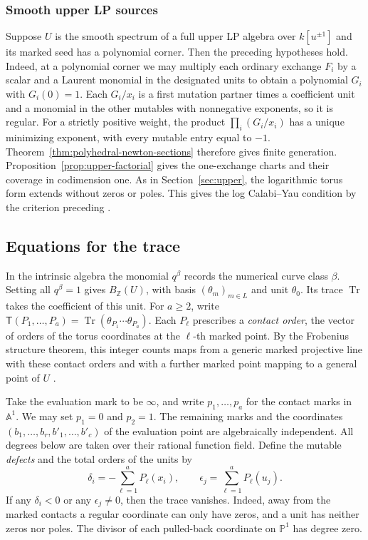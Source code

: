 \documentclass[11pt,reqno]{amsart}
\numberwithin{equation}{section}
\theoremstyle{definition}
\theoremstyle{remark}
\DeclareMathOperator{\Tr}{Tr}
\begin{document}
\subsubsection*{Smooth upper LP sources}
Suppose \(U\) is the smooth spectrum of a full upper LP algebra over
\(k[u^{\pm1}]\) and its marked seed has a polynomial corner. Then the
preceding hypotheses hold. Indeed, at a polynomial corner we may
multiply each ordinary exchange \(F_i\) by a scalar and a Laurent
monomial in the designated units to obtain a polynomial \(G_i\)
with \(G_i(0)=1\). Each \(G_i/x_i\) is a first
mutation partner times a coefficient unit and a monomial in the
other mutables with nonnegative exponents, so it is regular. For
a strictly positive weight, the product \(\prod_i(G_i/x_i)\) has
a unique minimizing exponent, with every mutable entry equal to \(-1\).
Theorem~\ref{thm:polyhedral-newton-sections} therefore gives finite
generation. Proposition~\ref{prop:upper-factorial} gives the
one-exchange charts and their coverage in codimension one. As in
Section~\ref{sec:upper}, the logarithmic torus form extends without
zeros or poles. This gives the log Calabi--Yau condition by the
criterion preceding \cite[Definition~2.1]{KY}.

\subsection{Equations for the trace}

In the intrinsic algebra the monomial \(q^\beta\) records the numerical
curve class \(\beta\). Setting all \(q^\beta=1\) gives \(B_{\mathbb Z}(U)\),
with basis \((\theta_m)_{m\in L}\) and unit \(\theta_0\). Its trace
\(\Tr\) takes the coefficient of this unit.
For \(a\ge2\), write \(\mathsf T(P_1,\ldots,P_a)=\Tr(\theta_{P_1}\cdots\theta_{P_a})\).
Each \(P_\ell\) prescribes a \emph{contact order}, the vector of
orders of the torus coordinates at the \(\ell\)-th marked point.
By the Frobenius structure theorem, this integer counts maps from a
generic marked projective line with these contact orders and with
a further marked point mapping to a general point of \(U\)
\cite[Theorem~1.2 and Proposition~3.13]{KY}.

Take the evaluation mark to be \(\infty\), and write \(p_1,\ldots,p_a\)
for the contact marks in \(\mathbb A^1\). We may set \(p_1=0\) and
\(p_2=1\). The remaining marks and the coordinates
\((b_1,\ldots,b_r,b'_1,\ldots,b'_c)\) of the evaluation point are
algebraically independent. All degrees below are taken over their
rational function field. Define the mutable \emph{defects} and the total orders of the units by
\[ \delta_i=-\sum_{\ell=1}^{a}P_\ell(x_i),\qquad \epsilon_j=\sum_{\ell=1}^{a}P_\ell(u_j). \]
If any \(\delta_i<0\) or any \(\epsilon_j\ne0\), then the trace vanishes.
Indeed, away from the marked contacts a regular coordinate can only
have zeros, and a unit has neither zeros nor poles. The divisor of
each pulled-back coordinate on \(\mathbb P^1\) has degree zero.
\end{document}
